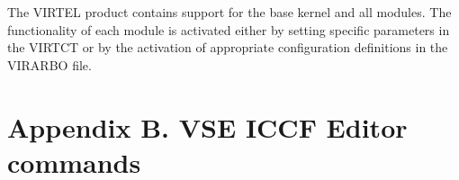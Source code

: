 \documentclass[letterpaper,10pt,english]{sphinxmanual}
\begin{document}
\sphinxAtStartPar
The VIRTEL product contains support for the base kernel and all modules. The functionality of each module is activated either by setting specific parameters in the VIRTCT or by the activation of appropriate configuration definitions in the VIRARBO file.

\begin{DUlineblock}{0em}
\item[] 
\end{DUlineblock}

\newpage


\section{Appendix B. VSE ICCF Editor commands}
\label{\detokenize{Installation_Guide:appendix-b-vse-iccf-editor-commands}}
\sphinxAtStartPar
{}

\begin{sphinxVerbatim}[commandchars=\\\{\}]
                      
                       
                       
                        
                      
                      
                       
\end{sphinxVerbatim}

\sphinxAtStartPar
{}

\begin{sphinxVerbatim}[commandchars=\\\{\}]
          
         
\end{sphinxVerbatim}

\sphinxAtStartPar
{}

\begin{sphinxVerbatim}[commandchars=\\\{\}]
         
\end{sphinxVerbatim}
\end{document}
